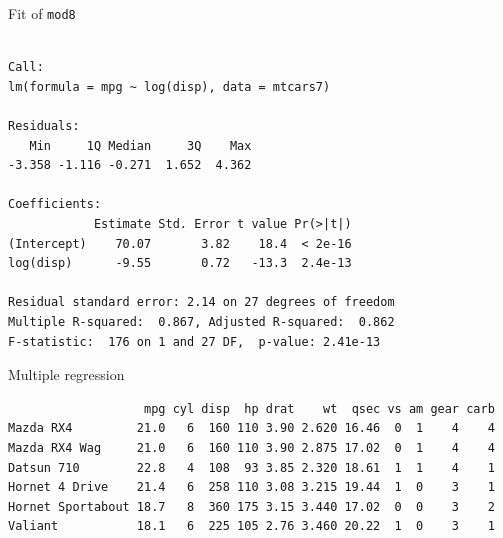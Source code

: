 \begin{frame}[fragile]{Fit of \texttt{mod8}}

\begin{Shaded}
\begin{Highlighting}[]
\end{Highlighting}
\end{Shaded}

\begin{verbatim}

Call:
lm(formula = mpg ~ log(disp), data = mtcars7)

Residuals:
   Min     1Q Median     3Q    Max 
-3.358 -1.116 -0.271  1.652  4.362 

Coefficients:
            Estimate Std. Error t value Pr(>|t|)
(Intercept)    70.07       3.82    18.4  < 2e-16
log(disp)      -9.55       0.72   -13.3  2.4e-13

Residual standard error: 2.14 on 27 degrees of freedom
Multiple R-squared:  0.867, Adjusted R-squared:  0.862 
F-statistic:  176 on 1 and 27 DF,  p-value: 2.41e-13
\end{verbatim}

\end{frame}

\begin{frame}[fragile]{Multiple regression}

\begin{Shaded}
\begin{Highlighting}[]
\end{Highlighting}
\end{Shaded}

\begin{verbatim}
                   mpg cyl disp  hp drat    wt  qsec vs am gear carb
Mazda RX4         21.0   6  160 110 3.90 2.620 16.46  0  1    4    4
Mazda RX4 Wag     21.0   6  160 110 3.90 2.875 17.02  0  1    4    4
Datsun 710        22.8   4  108  93 3.85 2.320 18.61  1  1    4    1
Hornet 4 Drive    21.4   6  258 110 3.08 3.215 19.44  1  0    3    1
Hornet Sportabout 18.7   8  360 175 3.15 3.440 17.02  0  0    3    2
Valiant           18.1   6  225 105 2.76 3.460 20.22  1  0    3    1
\end{verbatim}

\begin{Shaded}
\end{Shaded}

\end{frame}

